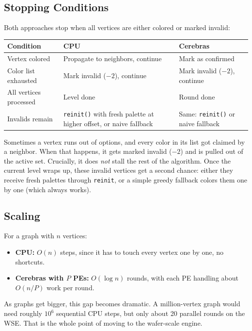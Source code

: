 \documentclass[11pt,letterpaper]{article}
\begin{document}
\subsection{Stopping Conditions}

Both approaches stop when all vertices are either colored or marked invalid:

\begin{center}
\renewcommand{\arraystretch}{1.3}
\begin{tabular}{>{\raggedright}p{3.4cm} p{4.5cm} p{4.5cm}}
\toprule
\textbf{Condition} & \textbf{CPU} & \textbf{Cerebras} \\
\midrule
Vertex colored & Propagate to neighbors, continue & Mark as confirmed \\
Color list exhausted & Mark invalid ($-2$), continue & Mark invalid ($-2$), continue \\
All vertices processed & Level done & Round done \\
Invalids remain & \texttt{reinit()} with fresh palette at higher offset, or naive fallback & Same: \texttt{reinit()} or naive fallback \\
\bottomrule
\end{tabular}
\end{center}

Sometimes a vertex runs out of options, and every color in its list got claimed by a neighbor. When that happens, it gets marked invalid ($-2$) and is pulled out of the active set. Crucially, it does \emph{not} stall the rest of the algorithm. Once the current level wraps up, these invalid vertices get a second chance: either they receive fresh palettes through \texttt{reinit}, or a simple greedy fallback colors them one by one (which always works).

\subsection{Scaling}

For a graph with $n$ vertices:
\begin{itemize}[nosep]
  \item \textbf{CPU:} $O(n)$ steps, since it has to touch every vertex one by one, no shortcuts.
  \item \textbf{Cerebras with $P$ PEs:} $O(\log n)$ rounds, with each PE handling about $O(n/P)$ work per round.
\end{itemize}

As graphs get bigger, this gap becomes dramatic. A million-vertex graph would need roughly $10^6$ sequential CPU steps, but only about 20 parallel rounds on the WSE. That is the whole point of moving to the wafer-scale engine.
\end{document}

